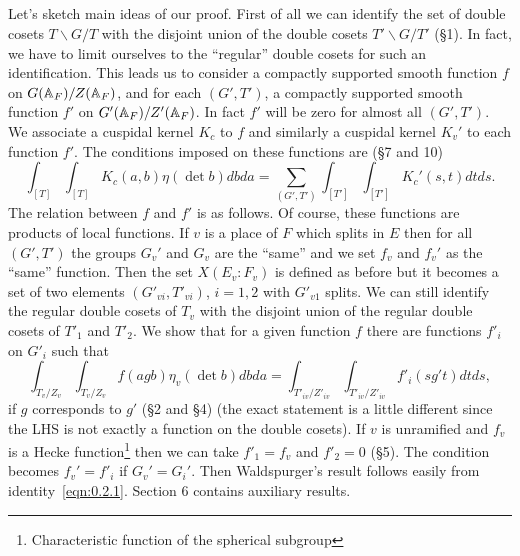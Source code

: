\subsection{}
Let's sketch main ideas of our proof.
First of all we can identify the set of double cosets $T\backslash G / T$ with the disjoint union of the double cosets $T' \backslash G / T'$ (\S 1).
In fact, we have to limit ourselves to the ``regular'' double cosets for such an identification.
This leads us to consider a compactly supported smooth function $f$ on $G(\mathbb{A}_F) / Z(\mathbb{A}_F)$, and for each $(G', T')$, a compactly supported smooth function $f'$ on $G'(\mathbb{A}_F) / Z'(\mathbb{A}_F)$.
In fact $f'$ will be zero for almost all $(G', T')$.
We associate a cuspidal kernel $K_c$ to $f$  and similarly a cuspidal kernel $K_v'$ to each function $f'$.
The conditions imposed on these functions are (\S 7 and 10)
\begin{equation}
    \int_{[T]}\int_{[T]} K_{c}(a, b) \eta(\det b) dbda = \sum_{(G', T')} \int_{[T']} \int_{[T']} K_{c}'(s, t) dtds.
\end{equation}
The relation between $f$ and $f'$ is as follows.
Of course, these functions are products of local functions.
If $v$ is a place of $F$ which splits in $E$ then for all $(G', T')$ the groups $G_v'$ and $G_v$ are the ``same'' and we set $f_v$ and $f_v'$ as the ``same'' function.
Then the set $X(E_v: F_v)$ is defined as before but it becomes a set of two elements $(G'_{vi}, T'_{vi})$, $i =1, 2$ with $G'_{v1}$ splits.
We can still identify the regular double cosets of $T_v$ with the disjoint union of the regular double cosets of $T'_1$ and $T'_2$.
We show that for a given function $f$ there are functions $f'_i$ on $G'_i$ such that
\begin{equation*}
\label{eqn:0.2.1}
    \int_{T_{v} / Z_{v}} \int_{T_v / Z_v} f(agb) \eta_v(\det b) db da = \int_{T'_{iv} / Z'_{iv}} \int_{T'_{iv}/Z'_{iv}} f'_{i} (sg't) dt ds,
\end{equation*}
if $g$ corresponds to $g'$ (\S 2 and  \S 4) (the exact statement is a little different since the LHS is not exactly a function on the double cosets).
If $v$ is unramified and $f_v$ is a Hecke function\footnote{Characteristic function of the spherical subgroup} then we can take $f'_1 = f_v$ and $f'_2 = 0$ (\S 5).
The condition becomes $f_v' = f'_i$ if $G_v' = G_i'$.
Then Waldspurger's result follows easily from identity~\eqref{eqn:0.2.1}.
Section 6 contains auxiliary results.

